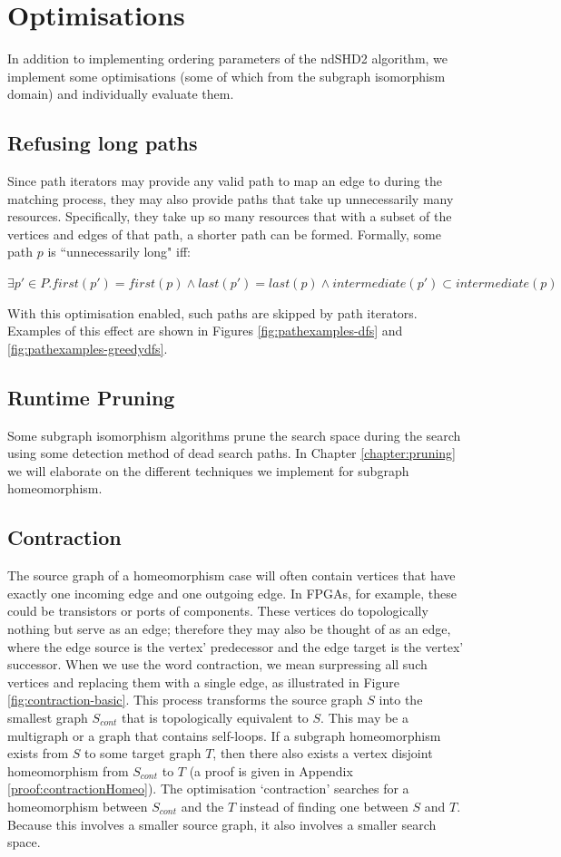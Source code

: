 \section{Optimisations}
In addition to implementing ordering parameters of the ndSHD2 algorithm, we implement some optimisations (some of which from the subgraph isomorphism domain) and individually evaluate them. 

\subsection{Refusing long paths}
Since path iterators may provide any valid path to map an edge to during the matching process, they may also provide paths that take up unnecessarily many resources. Specifically, they take up so many resources that with a subset of the vertices and edges of that path, a shorter path can be formed. Formally, some path $p$ is ``unnecessarily long" iff:


$\exists p' \in P . first(p') = first(p) \land last(p') = last(p) \land intermediate(p') \subset intermediate(p)$

With this optimisation enabled, such paths are skipped by path iterators. Examples of this effect are shown in Figures \ref{fig:pathexamples-dfs} and \ref{fig:pathexamples-greedydfs}.

\subsection{Runtime Pruning}
Some subgraph isomorphism algorithms\cite{Cordella2004, McCreesh2015} prune the search space during the search using some detection method of dead search paths. In Chapter \ref{chapter:pruning} we will elaborate on the different techniques we implement for subgraph homeomorphism.

\subsection{Contraction}
The source graph of a homeomorphism case will often contain vertices that have exactly one incoming edge and one outgoing edge. In FPGAs, for example, these could be transistors or ports of components. These vertices do topologically nothing but serve as an edge; therefore they may also be thought of as an edge, where the edge source is the vertex' predecessor and the edge target is the vertex' successor. When we use the word contraction, we mean surpressing all such vertices and replacing them with a single edge, as illustrated in Figure \ref{fig:contraction-basic}. This process transforms the source graph $S$ into the smallest graph $S_{cont}$ that is topologically equivalent to $S$. This may be a multigraph or a graph that contains self-loops. If a subgraph homeomorphism exists from $S$ to some target graph $T$, then there also exists a vertex disjoint homeomorphism from $S_{cont}$ to $T$ (a proof is given in Appendix \ref{proof:contractionHomeo}). The optimisation `contraction' searches for a homeomorphism between $S_{cont}$ and the $T$ instead of finding one between $S$ and $T$. Because this involves a smaller source graph, it also involves a smaller search space.

